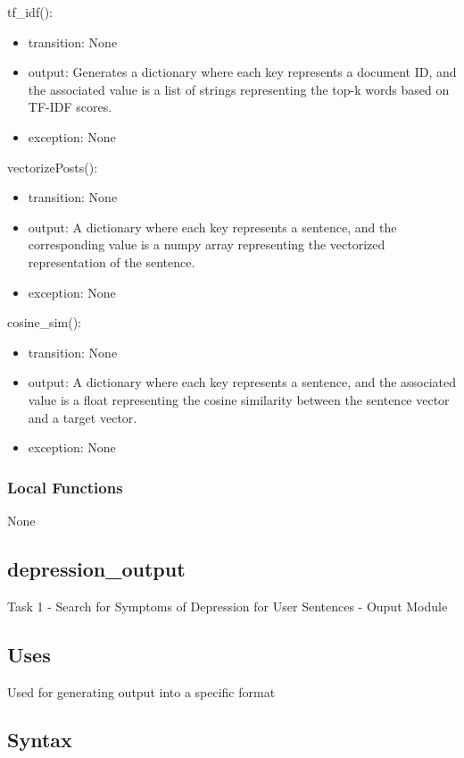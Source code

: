 \documentclass[12pt, titlepage]{article}
\begin{document}
\noindent tf\_idf():
\begin{itemize}
\item transition: None
\item output: Generates a dictionary where each key represents a document ID, and the associated value is a list of strings representing the top-k words based on TF-IDF scores.
\item exception: None
\end{itemize}

\noindent vectorizePosts():
\begin{itemize}
\item transition: None
\item output: A dictionary where each key represents a sentence, and the corresponding value is a numpy array representing the vectorized representation of the sentence.
\item exception: None
\end{itemize}

\noindent cosine\_sim():
\begin{itemize}
\item transition: None
\item output: A dictionary where each key represents a sentence, and the associated value is a float representing the cosine similarity between the sentence vector and a target vector.
\item exception: None
\end{itemize}

\subsubsection{Local Functions}

None

\subsection{depression\_output}

Task 1 - Search for Symptoms of Depression for User Sentences - Ouput Module

\subsection{Uses}

Used for generating output into a specific format

\subsection{Syntax}
\end{document}
